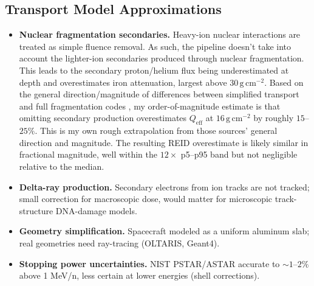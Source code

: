 \documentclass[a4paper,fleqn]{cas-sc}
\newcommand{\gcm}{\,\mathrm{g\,cm^{-2}}}
\newcommand{\Qeff}{Q_\mathrm{eff}}
\begin{document}
\subsection{Transport Model Approximations}
\begin{itemize}
  \item \textbf{Nuclear fragmentation secondaries.} Heavy-ion nuclear
        interactions are treated as simple fluence removal. As such, the pipeline doesn't take into account the lighter-ion secondaries produced through nuclear fragmentation.  This leads to the secondary
        proton/helium flux being underestimated at depth and overestimates iron attenuation,
        largest above $30\gcm$. Based on the general direction/magnitude of
        differences between simplified transport and full fragmentation
        codes \citep{wilson1991, slaba2014}, my order-of-magnitude estimate
        is that omitting secondary production overestimates $\Qeff$ at
        $16\gcm$ by roughly $15$--$25\%$. This is my own rough
        extrapolation from those sources' general direction and magnitude.
        The resulting REID overestimate is likely similar in fractional
        magnitude, well within the $12\times$ p5--p95 band but not
        negligible relative to the median.
  \item \textbf{Delta-ray production.} Secondary electrons from ion tracks
        are not tracked; small correction for macroscopic dose, would matter
        for microscopic track-structure DNA-damage models.
  \item \textbf{Geometry simplification.} Spacecraft modeled as a uniform
        aluminum slab; real geometries need ray-tracing (OLTARIS, Geant4).
  \item \textbf{Stopping power uncertainties.} NIST PSTAR/ASTAR accurate to
        $\sim\!1$--$2\%$ above 1 MeV/n, less certain at lower energies
        (shell corrections).
\end{itemize}
\end{document}
